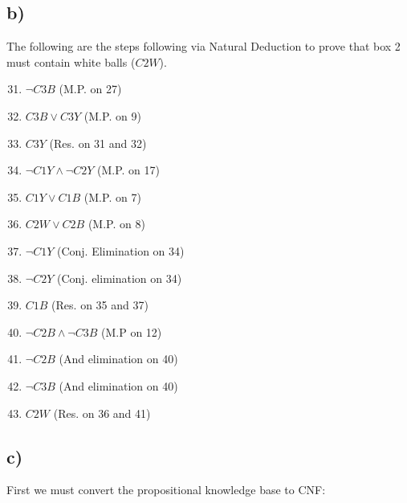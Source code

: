 \documentclass[22pt]{article}
\begin{document}
\subsection*{b)}
The following are the steps following via Natural Deduction to prove that 
box 2 must contain white balls ($C2W$).

\begin{multicols}{2}
\begin{enumerate}
	\setcounter{enumi}{30}
	\item $\neg C3B$ (M.P. on 27)
	\item $C3B \lor C3Y$ (M.P. on 9)
	\item $C3Y$ (Res. on 31 and 32)
	\item $\neg C1Y \land \neg C2Y$ (M.P. on 17)
	\item $C1Y \lor C1B$ (M.P. on 7)
	\item $C2W \lor C2B$ (M.P. on 8)
	\item $\neg C1Y$ (Conj. Elimination on 34)
	\item $\neg C2Y$ (Conj. elimination on 34)
	\item $C1B$ (Res. on 35 and 37)
	\item $\neg C2B \land \neg C3B$ (M.P on 12)
	\item $\neg C2B$ (And elimination on 40)
	\item $\neg C3B$ (And elimination on 40)
	\item $C2W$ (Res. on 36 and 41)
\end{enumerate}
\end{multicols}

\subsection*{c)}
First we must convert the propositional knowledge base to CNF:
\end{document}
